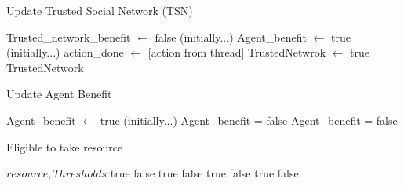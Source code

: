 \begin{algorithm}
\caption{Update Trusted Social Network (TSN)}\label{alg:16}
\begin{algorithmic}
\scriptsize
\State Trusted\_network\_benefit $ \leftarrow $ false (initially...)
\State Agent\_benefit $ \leftarrow $ true (initially...)
\State action\_done $ \leftarrow $ [action from thread]
\State TrustedNetwrok $ \leftarrow $ true
\EndIf
\State
\Return TrustedNetwork
\end{algorithmic}
\end{algorithm}



\begin{algorithm}
\caption{Update Agent Benefit}\label{alg:17}
\begin{algorithmic}
\scriptsize
\State Agent\_benefit $\leftarrow$ true (initially...)
\State Agent\_benefit = false
\EndIf
{}
\State Agent\_benefit = false
\EndIf
\end{algorithmic}
\end{algorithm}



\begin{algorithm}
\caption{Eligible to take resource}\label{alg:18}
\begin{algorithmic}
\scriptsize
\Require $resource,Thresholds$
\State
\Return true
\Else
\State
\Return false
\EndIf
\EndIf
{}
\State
\Return true
\Else
\State
\Return false
\EndIf
\EndIf
{}
\State
\Return true
\Else
\State
\Return false
\EndIf
\EndIf
{}
\State
\Return true
\Else
\State
\Return false
\EndIf
\EndIf
\end{algorithmic}
\end{algorithm}

